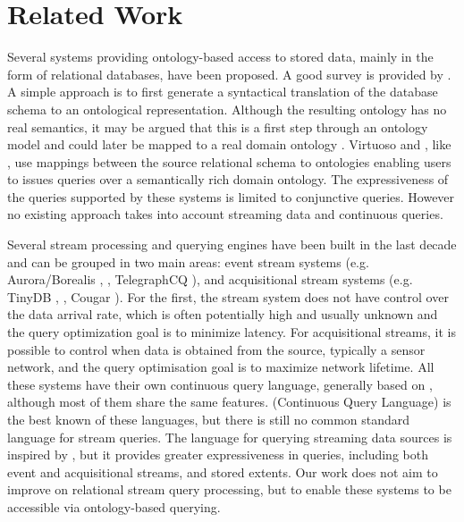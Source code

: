 \section{Related Work}
\label{sec:related-work}

Several systems providing ontology-based access to stored data, mainly in the form of relational databases, have been proposed.
A good survey is provided by \cite{Sahoo_09}.
A simple approach is to first generate a syntactical translation of the database schema to an ontological representation. 
Although the resulting ontology has no real semantics, it may be argued that this is a first step through an ontology model and could later be mapped to a real domain ontology \cite{Lubyte_09}.
Virtuoso \cite{Erling_07} and \dtworq  \cite{Bizer_07}, like \rtwoo, use mappings between the source relational schema to \rdf ontologies enabling users to issues queries over a semantically rich domain ontology.
The expressiveness of the queries supported by these systems is limited to conjunctive queries. 
However no existing approach takes into account streaming data and continuous queries.

Several stream processing and querying engines have been built in the last decade and can be grouped in two main areas: event stream systems (e.g. Aurora/Borealis \cite{Abadi_2005}, \stream \cite{Arasu_06a}, TelegraphCQ \cite{Chandrasekaran_03}), and acquisitional stream systems (e.g. TinyDB \cite{Madden_05}, \snee \cite{Galpin_09}, Cougar \cite{Yao_02}). 
For the first, the stream system does not have control over the data arrival rate, which is often potentially high and usually unknown and the query optimization goal is to minimize latency. 
For acquisitional streams, it is possible to control when data is obtained from the source, typically a sensor network, and the query optimisation goal is to maximize network lifetime. 
All these systems have their own continuous query language, generally based on \sql, although most of them share the same features. 
\cql (Continuous Query Language) \cite{Arasu_2006} is the best known of these languages, but  there is still no common standard  language for stream queries. 
The \sneeql\cite{Brenninkmeijer_08} language for querying streaming data sources is inspired by \cql, but it provides greater expressiveness in queries, including both event and acquisitional streams, and stored extents.
Our work does not aim to improve on relational stream query processing, but to enable these systems to be accessible via ontology-based querying.

